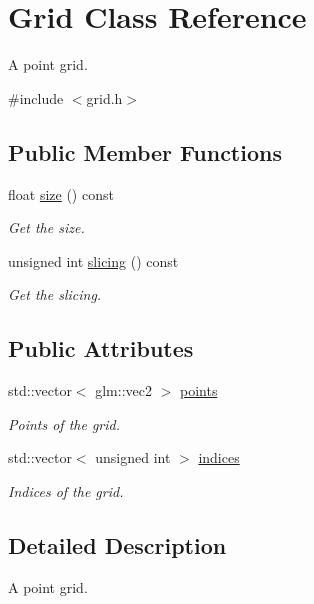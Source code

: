 \hypertarget{classGrid}{}\section{Grid Class Reference}
\label{classGrid}


A point grid.  




{\ttfamily \#include $<$grid.\+h$>$}

\subsection*{Public Member Functions}
\begin{DoxyCompactItemize}
\item 
float \hyperlink{classGrid_a5b900bea5220f07c95ea99cce2d7c2a9}{size} () const
\begin{DoxyCompactList}\small\item\em Get the size. \end{DoxyCompactList}\item 
unsigned int \hyperlink{classGrid_a8f3f213939fd848aba1bcd369defe7a3}{slicing} () const
\begin{DoxyCompactList}\small\item\em Get the slicing. \end{DoxyCompactList}\end{DoxyCompactItemize}
\subsection*{Public Attributes}
\begin{DoxyCompactItemize}
\item 
std\+::vector$<$ glm\+::vec2 $>$ \hyperlink{classGrid_a1ecea5aa80e7ea89dbd980e07fdf94e4}{points}
\begin{DoxyCompactList}\small\item\em Points of the grid. \end{DoxyCompactList}\item 
std\+::vector$<$ unsigned int $>$ \hyperlink{classGrid_a057222ca5900838736127c9665b1dd63}{indices}
\begin{DoxyCompactList}\small\item\em Indices of the grid. \end{DoxyCompactList}\end{DoxyCompactItemize}


\subsection{Detailed Description}
A point grid. 

